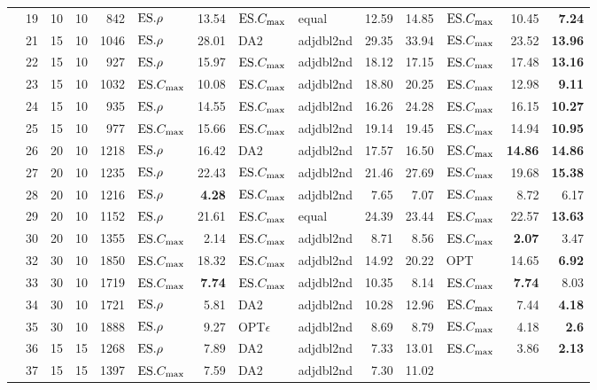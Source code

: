 {\begin{longtable}{l@{}rr@{$\times$}lr|lr|llr|r|lr|r}
&19 & 10&10 & 842 & $\text{ES}.{\rho}$ & 13.54 & $\text{ES}.{C_{\max}}$ & equal & 12.59 & 14.85 & 
$\text{ES}.{C_{\max}}$ & 10.45 & \textbf{7.24} \\ 
&21 & 15&10 & 1046 & $\text{ES}.{\rho}$ & 28.01 & DA2 & adjdbl2nd & 29.35 & 
33.94 & $\text{ES}.{C_{\max}}$ & 23.52 & \textbf{13.96} \\ 
&22 & 15&10 & 927 & $\text{ES}.{\rho}$ & 15.97 & $\text{ES}.{C_{\max}}$ & adjdbl2nd & 18.12 & 17.15 
& $\text{ES}.{C_{\max}}$ & 17.48 & \textbf{13.16} \\ 
&23 & 15&10 & 1032 & $\text{ES}.{C_{\max}}$ & 10.08 & $\text{ES}.{C_{\max}}$ & adjdbl2nd & 18.80 & 
20.25 
& $\text{ES}.{C_{\max}}$ & 12.98 & \textbf{9.11} \\ 
&24 & 15&10 & 935 & $\text{ES}.{\rho}$ & 14.55 & $\text{ES}.{C_{\max}}$ & adjdbl2nd & 16.26 & 24.28 
& $\text{ES}.{C_{\max}}$ & 16.15 & \textbf{10.27} \\ 
&25 & 15&10 & 977 & $\text{ES}.{C_{\max}}$ & 15.66 & $\text{ES}.{C_{\max}}$ & adjdbl2nd & 19.14 & 19.45 
& $\text{ES}.{C_{\max}}$ & 14.94 & \textbf{10.95} \\ 
&26 & 20&10 & 1218 & $\text{ES}.{\rho}$ & 16.42 & DA2 & adjdbl2nd & 17.57 & 16.50 
& $\text{ES}.{C_{\max}}$ & \textbf{14.86} & \textbf{14.86} \\ 
&27 & 20&10 & 1235 & $\text{ES}.{\rho}$ & 22.43 & $\text{ES}.{C_{\max}}$ & adjdbl2nd & 21.46 & 27.69 
& $\text{ES}.{C_{\max}}$ & 19.68 & \textbf{15.38} \\ 
&28 & 20&10 & 1216 & $\text{ES}.{\rho}$ & \textbf{4.28} & $\text{ES}.{C_{\max}}$ & adjdbl2nd & 7.65 
& 7.07 & $\text{ES}.{C_{\max}}$ & 8.72 & 6.17 \\ 
&29 & 20&10 & 1152 & $\text{ES}.{\rho}$ & 21.61 & $\text{ES}.{C_{\max}}$ & equal & 24.39 & 23.44 & 
$\text{ES}.{C_{\max}}$ & 22.57 & \textbf{13.63} \\ 
&30 & 20&10 & 1355 & $\text{ES}.{C_{\max}}$ & 2.14 & $\text{ES}.{C_{\max}}$ & adjdbl2nd & 8.71 & 8.56 & 
$\text{ES}.{C_{\max}}$ & \textbf{2.07} & 3.47 \\ 
&32 & 30&10 & 1850 & $\text{ES}.{C_{\max}}$ & 18.32 & $\text{ES}.{C_{\max}}$ & adjdbl2nd & 14.92 & 
20.22 & OPT & 14.65 & \textbf{6.92} \\ 
&33 & 30&10 & 1719 & $\text{ES}.{C_{\max}}$ & \textbf{7.74} & $\text{ES}.{C_{\max}}$ & adjdbl2nd & 
10.35 & 8.14 & $\text{ES}.{C_{\max}}$ & \textbf{7.74} & 8.03 \\ 
&34 & 30&10 & 1721 & $\text{ES}.{\rho}$ & 5.81 & DA2 & adjdbl2nd & 10.28 & 12.96 
& $\text{ES}.{C_{\max}}$ & 7.44 & \textbf{4.18} \\ 
&35 & 30&10 & 1888 & $\text{ES}.{\rho}$ & 9.27 & OPT$\epsilon$ & adjdbl2nd & 8.69 & 8.79 
& $\text{ES}.{C_{\max}}$ & 4.18 & \textbf{2.6} \\ 
&36 & 15&15 & 1268 & $\text{ES}.{\rho}$ & 7.89 & DA2 & adjdbl2nd & 7.33 & 13.01 
& $\text{ES}.{C_{\max}}$ & 3.86 & \textbf{2.13} \\ 
&37 & 15&15 & 1397 & $\text{ES}.{C_{\max}}$ & 7.59 & DA2 & adjdbl2nd & 7.30 & 11.02 

\end{longtable}}
